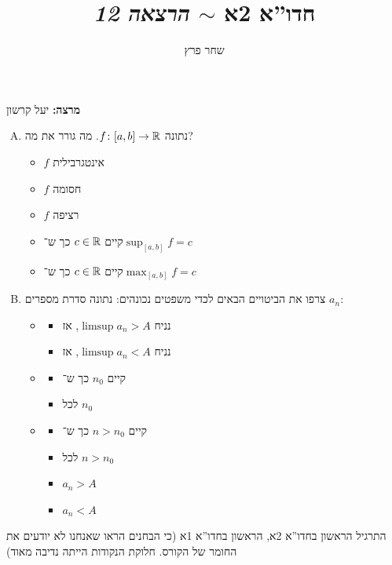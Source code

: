 \documentclass[]{../../../../tex/classes/styledArticle}
\author{שחר פרץ}
\title{חדו''א 2א $\sim$ \textit{הרצאה 12}}
\begin{document}
	\maketitle
	\textbf{מרצה: }יעל קרשון
	\begin{Exercise}[פתיחה]
		\begin{enumerate}[(A)]
			\item נתונה $f \colon [a, b] \to \mathbb{R}$. מה גורר את מה? 
			\begin{itemize}
				\item $f$ אינטגרבילית
				\item $f$ חסומה
				\item $f$ רציפה
				\item קיים $c \in \mathbb{R}$ כך ש־$\sup_{[a, b]} f = c$
				\item קיים $c \in \mathbb{R}$ כך ש־$\max_{[a, b]} f = c$
			\end{itemize}
			\item צרפו את הביטויים הבאים לכדי משפטים נכונהים: נתונה סדרת מספרים $a_n$: 
			\begin{itemize}
				\item 
				\begin{itemize}
					\item נניח $\limsup a_n > A$, אז
					\item נניח $\limsup a_n < A$, אז
				\end{itemize}
				\item 
				\begin{itemize}
					\item קיים $n_0$ כך ש־
					\item לכל $n_0$
				\end{itemize}
				\item 
				\begin{itemize}
					\item קיים $n > n_0$ כך ש־
					\item לכל $n > n_0$
				\end{itemize}
				\begin{itemize}
					\item $a_n > A$
					\item $a_n < A$
				\end{itemize}
			\end{itemize}
		\end{enumerate}
	\end{Exercise}
	התרגיל הראשון בחדו''א 2א, הראשון בחדו''א 1א (כי הבחנים הראו שאנחנו לא יודעים את החומר של הקורס. חלוקת הנקודות הייתה נדיבה מאוד)
	
\end{document}
